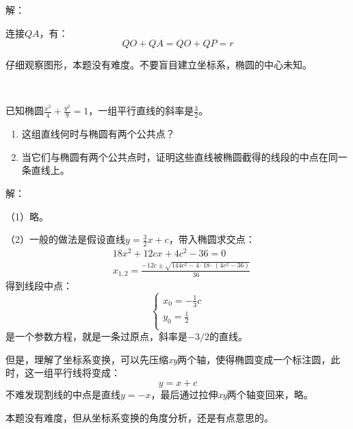 \begin{figure}[h]
\centering
{}
\end{figure}

解：

连接$QA$，有：
\[
QO+QA=QO+QP=r
\]

\begin{tcolorbox}
仔细观察图形，本题没有难度。不要盲目建立坐标系，椭圆的中心未知。
\end{tcolorbox}

~

\begin{example}
已知椭圆$\frac{x^2}{4}+\frac{y^2}{9}=1$，一组平行直线的斜率是$\frac{3}{2}$。
\begin{enumerate}
    \item 这组直线何时与椭圆有两个公共点？
    \item 当它们与椭圆有两个公共点时，证明这些直线被椭圆截得的线段的中点在同一条直线上。
\end{enumerate}
\end{example}

解：

（1）略。

（2）一般的做法是假设直线$y=\frac{3}{2}x+c$，带入椭圆求交点：
\begin{align*}
&18x^2+12cx+4c^2-36=0 \\
&x_{1,2}=\frac{-12c\pm \sqrt{144c^2-4\cdot 18\cdot \left( 4c^2-36 \right)}}{36}
\end{align*}
得到线段中点：
\[
\begin{cases}
	x_0=-\frac{1}{3}c\\
	y_0=\frac{1}{2}\\
\end{cases}
\]
是一个参数方程，就是一条过原点，斜率是$-3/2$的直线。

但是，理解了坐标系变换，可以先压缩{\it xy}两个轴，使得椭圆变成一个标注圆，此时，这一组平行线将变成：
\[
y=x+c
\]
不难发现割线的中点是直线$y=-x$，最后通过拉伸{\it xy}两个轴变回来，略。

\begin{tcolorbox}
本题没有难度，但从坐标系变换的角度分析，还是有点意思的。
\end{tcolorbox}




